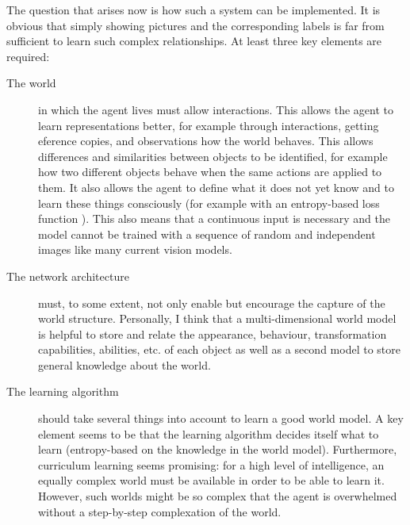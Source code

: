 The question that arises now is how such a system can be implemented. It is obvious that simply showing pictures and the corresponding labels is far from sufficient to learn such complex relationships. At least three key elements are required:


\begin{description}
	\item[The world] in which the agent lives must allow interactions. This allows the agent to learn representations better, for example through interactions, getting eference copies, and observations how the world behaves. This allows differences and similarities between objects to be identified, for example how two different objects behave when the same actions are applied to them. It also allows the agent to define what it does not yet know and to learn these things consciously (for example with an entropy-based loss function ). This also means that a continuous input is necessary and the model cannot be trained with a sequence of random and independent images like many current vision models.
	\item[The network architecture] must, to some extent, not only enable but encourage the capture of the world structure. Personally, I think that a multi-dimensional world model is helpful to store and relate the appearance, behaviour, transformation capabilities, abilities, etc. of each object as well as a second model to store general knowledge about the world. %
	\item[The learning algorithm] should take several things into account to learn a good world model. A key element seems to be that the learning algorithm decides itself what to learn (entropy-based on the knowledge in the world model). Furthermore, curriculum learning seems promising: for a high level of intelligence, an equally complex world must be available in order to be able to learn it. However, such worlds might be so complex that the agent is overwhelmed without a step-by-step complexation of the world.%
\end{description}


